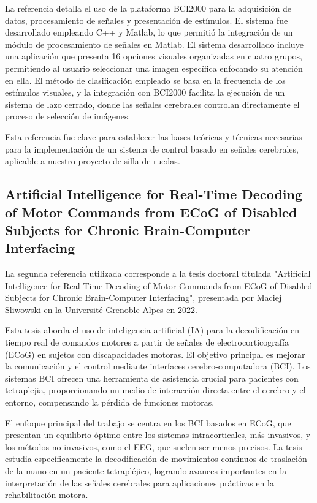 \documentclass{article}
\begin{document}
La referencia detalla el uso de la plataforma BCI2000 para la adquisición de datos, procesamiento de señales y presentación de estímulos. El sistema fue desarrollado empleando C++ y Matlab, lo que permitió la integración de un módulo de procesamiento de señales en Matlab.
El sistema desarrollado incluye una aplicación que presenta 16 opciones visuales organizadas en cuatro grupos, permitiendo al usuario seleccionar una imagen específica enfocando su atención en ella.
El método de clasificación empleado se basa en la frecuencia de los estímulos visuales, y la integración con BCI2000 facilita la ejecución de un sistema de lazo cerrado, donde las señales cerebrales controlan directamente el proceso de selección de imágenes.

Esta referencia fue clave para establecer las bases teóricas y técnicas necesarias para la implementación de un sistema de control basado en señales cerebrales, aplicable a nuestro proyecto de silla de ruedas.

\subsection{Artificial Intelligence for Real-Time Decoding of Motor Commands from ECoG of Disabled Subjects for Chronic Brain-Computer Interfacing}


La segunda referencia utilizada corresponde a la tesis doctoral titulada "Artificial Intelligence for Real-Time Decoding of Motor Commands from ECoG of Disabled Subjects for Chronic Brain-Computer Interfacing", presentada por Maciej Sliwowski en la Université Grenoble Alpes en 2022.

Esta tesis aborda el uso de inteligencia artificial (IA) para la decodificación en tiempo real de comandos motores a partir de señales de electrocorticografía (ECoG) en sujetos con discapacidades motoras. El objetivo principal es mejorar la comunicación y el control mediante interfaces cerebro-computadora (BCI). Los sistemas BCI ofrecen una herramienta de asistencia crucial para pacientes con tetraplejia, proporcionando un medio de interacción directa entre el cerebro y el entorno, compensando la pérdida de funciones motoras.

El enfoque principal del trabajo se centra en los BCI basados en ECoG, que presentan un equilibrio óptimo entre los sistemas intracorticales, más invasivos, y los métodos no invasivos, como el EEG, que suelen ser menos precisos. La tesis estudia específicamente la decodificación de movimientos continuos de traslación de la mano en un paciente tetrapléjico, logrando avances importantes en la interpretación de las señales cerebrales para aplicaciones prácticas en la rehabilitación motora.
\end{document}

